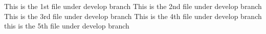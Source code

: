 This is the 1st file under develop branch
This is the 2nd file under develop branch
This is the 3rd file under develop branch
This is the 4th file under develop branch
this is the 5th file under develop branch
